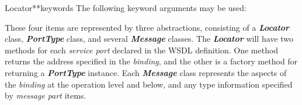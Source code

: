  
\begin{classdesc}{Locator}{**keywords}
The following keyword arguments may be used:
% 
% 
% 
% 
% 

\end{classdesc}



These four items are represented by three abstractions, consisting of a
{\it \bfseries Locator} class, {\it \bfseries PortType} class, and several 
{\it \bfseries Message} classes. The {\it \bfseries Locator} will have two methods for each {\it service port} declared in
the WSDL definition.  One method returns the address specified in the {\it binding}, and the other is a factory method for returning a {\it \bfseries PortType}
instance.  Each {\it \bfseries Message} class represents the aspects of the {\it binding}
at the operation level and below, and any type information specified by {\it message part} items.

